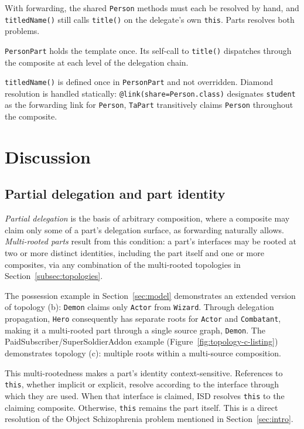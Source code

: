 \documentclass[acmsmall,nonacm]{acmart}
\theoremstyle{acmplain}
\newcommand{\code}[1]{\texttt{#1}}
\begin{document}
With forwarding, the shared \code{Person} methods
must each be resolved by hand, and \code{titledName()} still calls
\code{title()} on the delegate's own \code{this}. Parts resolves both problems.

\code{PersonPart} holds the template once. Its self-call to \code{title()}
dispatches through the composite at each level of the delegation chain.

\code{titledName()} is defined once in \code{PersonPart} and not overridden.
Diamond resolution is handled statically: \code{@link(share=Person.class)}
designates \code{student} as the forwarding link for \code{Person}, \code{TaPart}
transitively claims \code{Person} throughout the composite.

\section{Discussion}
\label{sec:discussion}

\subsection{Partial delegation and part identity}
\label{subsec:identity}

\emph{Partial delegation} is the basis of arbitrary composition, where a composite may claim only some of a part's delegation
surface, as forwarding naturally allows. \emph{Multi-rooted parts} result from this condition: a part's interfaces may be
rooted at two or more distinct identities, including the part itself and one or more composites, via any combination of
the multi-rooted topologies in Section~\ref{subsec:topologies}.

The possession example in Section~\ref{sec:model} demonstrates an extended version of topology (b): \code{Demon} claims
only \code{Actor} from \code{Wizard}. Through delegation propagation, \code{Hero} consequently has separate roots for \code{Actor}
and \code{Combatant}, making it a multi-rooted part through a single source graph, \code{Demon}. The PaidSubscriber/SuperSoldierAddon
example (Figure~\ref{fig:topology-c-listing}) demonstrates topology (c): multiple roots within a multi-source composition.

This multi-rootedness makes a part's identity context-sensitive. References to \code{this}, whether implicit or explicit,
resolve according to the interface through which they are used. When that interface is claimed, ISD resolves \code{this}
to the claiming composite. Otherwise, \code{this} remains the part itself. This is a direct resolution of the Object Schizophrenia
problem mentioned in Section~\ref{sec:intro}.
\end{document}
